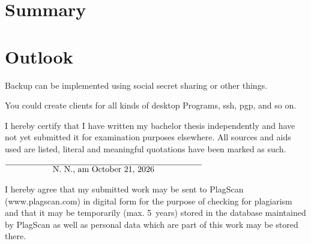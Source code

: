 \documentclass[12pt,oneside,a4paper,parskip]{scrbook}
\def\BaAuthor{Achim Winter}
\def\ShowBaAuthor{\BaAuthor}
\def\ShowBaAuthor{N.~N.}
\begin{document}

\chapter{Summary}

\chapter{Outlook}

Backup can be implemented using social secret sharing or other things.

You could create clients for all kinds of desktop Programs, ssh, pgp, and so on.

\parencite{gamma2011patterns}

\backmatter

\listoffigures
{}

\listoftables


\cleardoublepage
{}
{}
\printbibliography



I hereby certify that I have written my bachelor thesis independently and have not yet submitted it for examination purposes elsewhere. All sources and aids used are listed, literal and meaningful quotations have been marked as such.

\vspace{20pt}
\begin{flushright}
$\overline{~~~~~~~~~~~~~~~~~\mbox{\ShowBaAuthor, am \today}~~~~~~~~~~~~~~~~~}$
\end{flushright}


I hereby agree that my submitted work may be sent to PlagScan (www.plagscan.com) in digital form for the purpose of checking for plagiarism and that it may be temporarily (max. 5~years) stored in the database maintained by PlagScan as well as personal data which are part of this work may be stored there.
\end{document}
